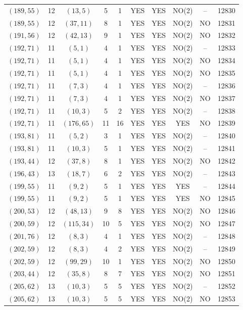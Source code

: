 \begin{longtable}{|c|c|c|c|c|c|c|c|c|c|}
$(189, 55)$ & 12 & $(13, 5)$ & 5 & 1 & YES & YES & NO(2) & -- & 12830\\
$(189, 55)$ & 12 & $(37, 11)$ & 8 & 1 & YES & YES & NO(2) & NO & 12831\\
$(191, 56)$ & 12 & $(42, 13)$ & 9 & 1 & YES & YES & NO(2) & NO & 12832\\
$(192, 71)$ & 11 & $(5, 1)$ & 4 & 1 & YES & YES & NO(2) & -- & 12833\\
$(192, 71)$ & 11 & $(5, 1)$ & 4 & 1 & YES & YES & NO(2) & NO & 12834\\
$(192, 71)$ & 11 & $(5, 1)$ & 4 & 1 & YES & YES & NO(2) & NO & 12835\\
$(192, 71)$ & 11 & $(7, 3)$ & 4 & 1 & YES & YES & NO(2) & -- & 12836\\
$(192, 71)$ & 11 & $(7, 3)$ & 4 & 1 & YES & YES & NO(2) & NO & 12837\\
$(192, 71)$ & 11 & $(10, 3)$ & 5 & 2 & YES & YES & NO(2) & -- & 12838\\
$(192, 71)$ & 11 & $(176, 65)$ & 11 & 16 & YES & YES & YES & NO & 12839\\
$(193, 81)$ & 11 & $(5, 2)$ & 3 & 1 & YES & YES & NO(2) & -- & 12840\\
$(193, 81)$ & 11 & $(10, 3)$ & 5 & 1 & YES & YES & NO(2) & -- & 12841\\
$(193, 44)$ & 12 & $(37, 8)$ & 8 & 1 & YES & YES & NO(2) & NO & 12842\\
$(196, 43)$ & 13 & $(18, 7)$ & 6 & 2 & YES & YES & NO(2) & -- & 12843\\
$(199, 55)$ & 11 & $(9, 2)$ & 5 & 1 & YES & YES & YES & -- & 12844\\
$(199, 55)$ & 11 & $(9, 2)$ & 5 & 1 & YES & YES & YES & NO & 12845\\
$(200, 53)$ & 12 & $(48, 13)$ & 9 & 8 & YES & YES & NO(2) & NO & 12846\\
$(200, 59)$ & 12 & $(115, 34)$ & 10 & 5 & YES & YES & NO(2) & NO & 12847\\
$(201, 76)$ & 12 & $(8, 3)$ & 4 & 1 & YES & YES & NO(2) & -- & 12848\\
$(202, 59)$ & 12 & $(8, 3)$ & 4 & 2 & YES & YES & NO(2) & -- & 12849\\
$(202, 59)$ & 12 & $(99, 29)$ & 10 & 1 & YES & YES & NO(2) & NO & 12850\\
$(203, 44)$ & 12 & $(35, 8)$ & 8 & 7 & YES & YES & NO(2) & NO & 12851\\
$(205, 62)$ & 13 & $(10, 3)$ & 5 & 5 & YES & YES & NO(2) & -- & 12852\\
$(205, 62)$ & 13 & $(10, 3)$ & 5 & 5 & YES & YES & NO(2) & NO & 12853\\

\end{longtable}
